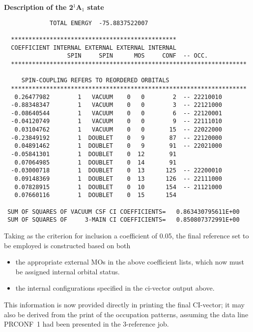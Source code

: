 \documentclass[11pt,fleqn]{article}
\begin{document}
{\bf Description of the 2$^{1}$A$_{1}$ state}
{
\footnotesize
\begin{verbatim}
             TOTAL ENERGY  -75.8837522007

  ***********************************************
  COEFFICIENT INTERNAL EXTERNAL EXTERNAL INTERNAL
                  SPIN     SPIN      MOS     CONF  -- OCC.
  *******************************************************************

     SPIN-COUPLING REFERS TO REORDERED ORBITALS
  *******************************************************************
   0.26477982        1   VACUUM    0   0        2  -- 22210010
  -0.88348347        1   VACUUM    0   0        3  -- 22121000
  -0.08640544        1   VACUUM    0   0        6  -- 22120001
  -0.04120749        1   VACUUM    0   0        9  -- 22111010
   0.03104762        1   VACUUM    0   0       15  -- 22022000
  -0.23849192        1  DOUBLET    0   9       87  -- 22120000
   0.04891462        1  DOUBLET    0   9       91  -- 22021000
  -0.05841301        1  DOUBLET    0  12       91
   0.07064985        1  DOUBLET    0  14       91
  -0.03000718        1  DOUBLET    0  13      125  -- 22200010
   0.09148369        1  DOUBLET    0  13      126  -- 22111000
   0.07828915        1  DOUBLET    0  10      154  -- 21121000
   0.07660116        1  DOUBLET    0  15      154
 
 SUM OF SQUARES OF VACUUM CSF CI COEFFICIENTS=   0.863430795611E+00
 SUM OF SQUARES OF     3-MAIN CI COEFFICIENTS=   0.850807372991E+00
\end{verbatim}
}
Taking as the criterion for inclusion a coefficient of 0.05, the final
reference set to be employed is constructed based on both
\begin{itemize}
\item the appropriate external MOs in the above coefficient lists,
which now must be assigned internal orbital status.
\item the internal configurations specified in the
ci-vector output above. 
\end{itemize}
This information is now provided directly in 
printing the final CI-vector;  it may also  be derived
from the print of the occupation patterns, assuming the data
line PRCONF~1 had been presented in the 3-reference job.
\end{document}
